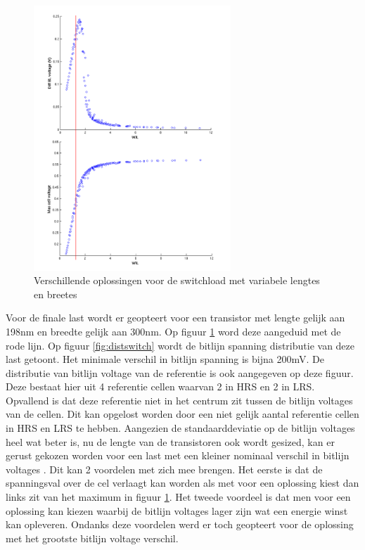 \begin{figure}[!ht]
  \centering
  \includegraphics[width=0.66\textwidth]{../fig/hfdst-last-length.png}
  \caption{Verschillende oplossingen voor de switchload met variabele lengtes en breetes}
  \label{fig:length}
\end{figure}

Voor de finale last wordt er geopteert voor een transistor met lengte gelijk aan 198nm en breedte gelijk aan 300nm. Op figuur \ref{fig:length} word deze aangeduid met de rode lijn. Op figuur \ref{fig:distswitch} wordt de bitlijn spanning distributie van deze last getoont. Het minimale verschil in bitlijn spanning is bijna 200mV. De distributie van bitlijn voltage van de referentie is ook aangegeven op deze figuur. Deze bestaat hier uit 4 referentie cellen waarvan 2 in HRS en 2 in LRS. Opvallend is dat deze referentie niet in het centrum zit tussen de bitlijn voltages van de cellen. Dit kan opgelost worden door een niet gelijk aantal referentie cellen in HRS en LRS te hebben. Aangezien de standaarddeviatie op de bitlijn voltages heel wat beter is, nu de lengte van de transistoren ook wordt gesized, kan er gerust gekozen worden voor een last met een kleiner nominaal verschil in bitlijn voltages \label{anderelast}. Dit kan 2 voordelen met zich mee brengen. Het eerste is dat de spanningsval over de cel verlaagt kan worden als met voor een oplossing kiest dan links zit van het maximum in figuur \ref{fig:length}. Het tweede voordeel is dat men voor een oplossing kan kiezen waarbij de bitlijn voltages lager zijn wat een energie winst kan opleveren. Ondanks deze voordelen werd er toch geopteert voor de oplossing met het grootste bitlijn voltage verschil.

